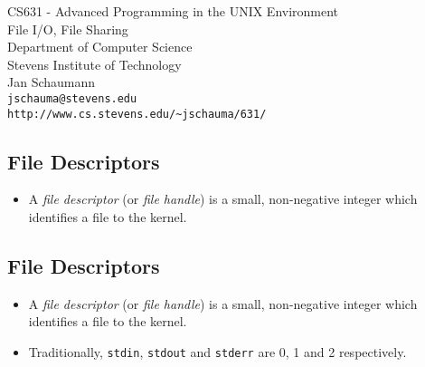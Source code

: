 \documentclass[xga]{xdvislides}
\begin{document}
\setfontphv

\lhead{\slidetitle}
\rhead{\relax}
\cfoot{\relax}
\rfoot{\Gray{\today}}

\vspace*{\fill}
\begin{center}
	\Hugesize
		CS631 - Advanced Programming in the UNIX Environment\\ [1em]
		File I/O, File Sharing
	\hspace*{5mm}\blueline\\ [1em]
	\Normalsize
		Department of Computer Science\\
		Stevens Institute of Technology\\
		Jan Schaumann\\
		\verb+jschauma@stevens.edu+\\
		\verb+http://www.cs.stevens.edu/~jschauma/631/+
\end{center}
\vspace*{\fill}


%
\subsection{File Descriptors}
\begin{itemize}
	\item A {\em file descriptor} (or {\em file handle}) is a small,
		non-negative integer which identifies a file to the kernel.
\end{itemize}


\subsection{File Descriptors}
\begin{itemize}
	\item A {\em file descriptor} (or {\em file handle}) is a small,
		non-negative integer which identifies a file to the kernel.
	\item Traditionally, {\tt stdin}, {\tt stdout} and {\tt stderr}
		are 0, 1 and 2 respectively.
\end{itemize}
\end{document}

